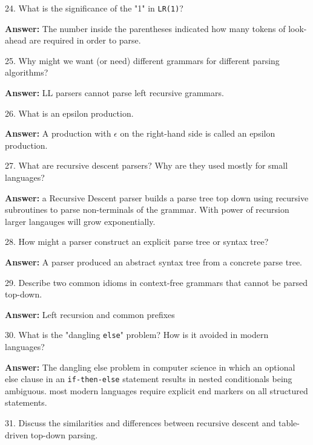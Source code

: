 24. What is the significance of the "1" in {\tt LR(1)}?

\vskip 3mm
{\bf Answer:} The number inside the parentheses indicated how many tokens of look-ahead are required in order to parse.

\filbreak
\vskip 1cm

25. Why might we want (or need) different grammars for different parsing algorithms?

\vskip 3mm
{\bf Answer:} LL parsers cannot parse left recursive grammars.

\filbreak
\vskip 1cm

26. What is an epsilon production.

\vskip 3mm
{\bf Answer:} A production with $\epsilon$ on the right-hand side is called an epsilon production.

\filbreak
\vskip 1cm

27. What are recursive descent parsers? Why are they used mostly for small languages?

\vskip 3mm
{\bf Answer:} a Recursive Descent parser builds a parse tree top down using recursive subroutines to parse non-terminals of the grammar. With power of recursion larger langauges will grow exponentially.

\filbreak
\vskip 1cm

28. How might a parser construct an explicit parse tree or syntax tree?

\vskip 3mm
{\bf Answer:} A parser produced an abstract syntax tree from a concrete  parse tree.

\filbreak
\vskip 1cm

29. Describe two common idioms in context-free grammars that cannot be parsed top-down.

\vskip 3mm
{\bf Answer:} Left recursion and common prefixes

\filbreak
\vskip 1cm

30. What is the "dangling {\tt else}" problem? How is it avoided in modern languages?

\vskip 3mm
{\bf Answer:} The dangling else problem in computer science in which an optional else clause in an {\tt if-then-else} statement results in nested conditionals being ambiguous. most modern languages require explicit end markers on all structured statements.

\filbreak
\vskip 1cm

31. Discuss the similarities and differences between recursive descent and table-driven top-down parsing.

